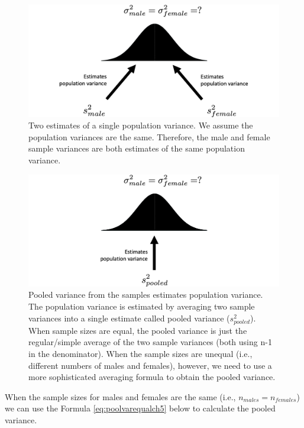 \documentclass[
]{krantz}
\begin{document}
\vspace{25mm}

\begin{figure}
\includegraphics[width=0.8\linewidth]{ch_samples/images/pool2} \caption[Two estimates of a single population variance]{Two estimates of a single population variance. We assume the population variances are the same. Therefore, the male and female sample variances are both estimates of the same population variance.}\label{fig:pool2}
\end{figure}

\newpage

\begin{figure}
\includegraphics[width=0.8\linewidth]{ch_samples/images/pool3} \caption[Pooled variance estimates population variance]{Pooled variance from the samples estimates population variance. The population variance is estimated by averaging two sample variances into a single estimate called pooled variance ($s_{pooled}^2$). When sample sizes are equal, the pooled variance is just the regular/simple average of the two sample variances (both using n-1 in the denominator). When the sample sizes are unequal (i.e., different numbers of males and females), however, we need to use a more sophisticated averaging formula to obtain the pooled variance.}\label{fig:pool3}
\end{figure}

When the sample sizes for males and females are the same (i.e., \(n_{males} =n_{females}\)) we can use the Formula \eqref{eq:poolvarequalch5} below to calculate the pooled variance.
\end{document}
